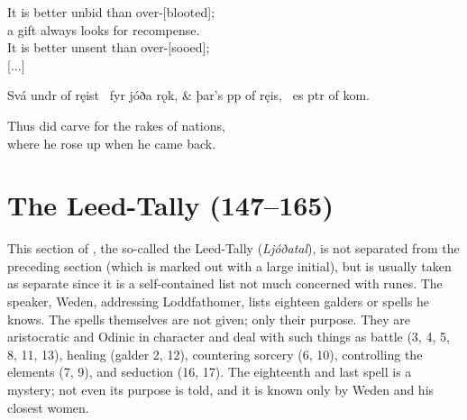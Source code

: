 \bvg\bva{}%
\eva

\bvb It is better unbid than over-[blooted]; \\
\ind a gift always looks for recompense. \\
It is better unsent than over-[sooed]; \\
{[...]}\evb\evg


\bvg\bva{}%
Svá undr of ręist \hld\ fyr jóða rǫk, &
þar’s pp of ręis, \hld\ es ptr of kom.\eva

\bvb Thus did   carve for the rakes of nations, \\
where he rose up when he came back.\evb\evg

\sectionline

\section{The Leed-Tally (147–165)}

This section of \Havamal, the so-called the Leed-Tally (\emph{Ljóðatal}), is not separated from the preceding section (which is marked out with a large initial), but is usually taken as separate since it is a self-contained list not much concerned with runes.  The speaker, Weden, addressing Loddfathomer, lists eighteen galders or spells he knows.  The spells themselves are not given; only their purpose.  They are aristocratic and Odinic in character and deal with such things as battle (3, 4, 5, 8, 11, 13), healing (galder 2, 12), countering sorcery (6, 10), controlling the elements (7, 9), and seduction (16, 17).  The eighteenth and last spell is a mystery; not even its purpose is told, and it is known only by Weden and his closest women.

